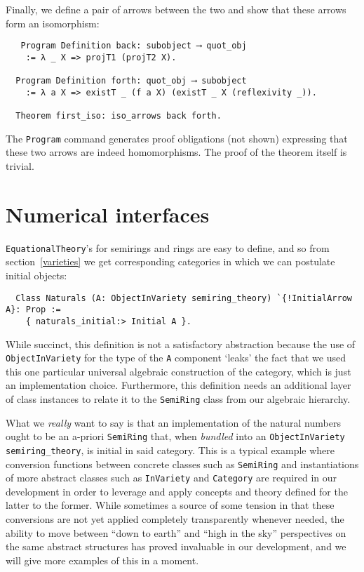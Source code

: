 \documentclass[a4paper,10pt,runningheads]{llncs}
\begin{document}
Finally, we define a pair of arrows between the two and show that these arrows form an isomorphism:
\begin{lstlisting}
   Program Definition back: subobject ⟶ quot_obj
    := λ _ X => projT1 (projT2 X).

  Program Definition forth: quot_obj ⟶ subobject
    := λ a X => existT _ (f a X) (existT _ X (reflexivity _)).

  Theorem first_iso: iso_arrows back forth.
\end{lstlisting}
The \lstinline|Program| command generates proof obligations (not shown) expressing that these two arrows are indeed homomorphisms. The proof of the theorem itself is trivial.


\section{Numerical interfaces}\label{numbers}

\lstinline|EquationalTheory|'s for semirings and rings are easy to define, and so from section~\ref{varieties} we get corresponding categories in which we can postulate initial objects:
\begin{lstlisting}
  Class Naturals (A: ObjectInVariety semiring_theory) `{!InitialArrow A}: Prop :=
    { naturals_initial:> Initial A }.
\end{lstlisting}
While succinct, this definition is not a satisfactory abstraction because the use of \lstinline|ObjectInVariety| for the type of the \lstinline|A| component `leaks' the fact that we used this one particular universal algebraic construction of the category, which is just an implementation choice. Furthermore, this definition needs an additional layer of class instances to relate it to the \lstinline|SemiRing| class from our algebraic hierarchy.

What we \emph{really} want to say is that an implementation of the natural numbers ought to be an a-priori \lstinline|SemiRing| that, when \emph{bundled} into an \lstinline|ObjectInVariety semiring_theory|, is initial in said category. This is a typical example where conversion functions between concrete classes such as \lstinline|SemiRing| and instantiations of more abstract classes such as \lstinline|InVariety| and \lstinline|Category| are required in our development in order to leverage and apply concepts and theory defined for the latter to the former. While sometimes a source of some tension in that these conversions are not yet applied completely transparently whenever needed, the ability to move between ``down to earth'' and ``high in the sky'' perspectives on the same abstract structures has proved invaluable in our development, and we will give more examples of this in a moment.
\end{document}
